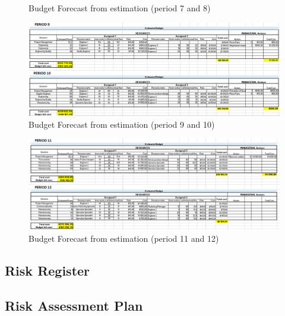 \begin{appendices}
\begin{landscape}
\begin{figure}[H]
\caption{Budget Forecast from estimation (period 7 and 8)}
\end{figure}
\begin{figure}[H]
\includegraphics[scale=0.8]{forecast/budget_forecast_est_910.PNG}
\caption{Budget Forecast from estimation (period 9 and 10)}
\end{figure}
\begin{figure}[H]
\includegraphics[scale=0.8]{forecast/budget_forecast_est_1112.PNG}
\caption{Budget Forecast from estimation (period 11 and 12)}
\end{figure}

\end{landscape}

\begin{landscape}

\section{Risk Register}
\subsection{Risk Assessment Plan}
\label{appendix:projectrisks}


\end{landscape}
\end{appendices}
